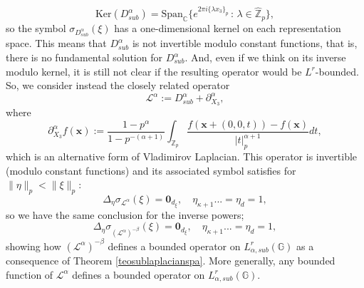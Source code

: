 \documentclass[12pt, reqno]{amsart}
\newcommand{\C}{\mathbb{C}}
\newcommand{\Z}{\mathbb{Z}}
\newcommand{\1}{\mathds{1}}
\newcommand{\G}{\mathbb{G}}
\begin{document}
$$\mathrm{Ker}(D^\alpha_{sub}) = \mathrm{Span}_\C \{ e^{2 \pi i \{\lambda x_3 \}_p} \, : \, \lambda  \in \widehat{\Z}_p \},$$so the symbol $\sigma_{D^\alpha_{sub}} (\xi)$ has a one-dimensional kernel on each representation space. This means that $D^\alpha_{sub}$ is not invertible modulo constant functions, that is, there is no fundamental solution for $D^\alpha_{sub}$. And, even if we think on its inverse modulo kernel, it is still not clear if the resulting operator would be $L^r$-bounded. So, we consider instead the closely related operator $$\mathscr{L}^\alpha := D^\alpha_{sub} + \partial^\alpha_{X_3},$$where $$\partial^\alpha_{X_3}f(\mathbf{x}):= \frac{1-p^\alpha}{1-p^{-(\alpha + 1)}}\int_{\Z_p} \frac{f(\mathbf{x} + (0,0,t)) - f(\mathbf{x})}{|t|_p^{\alpha + 1}} dt,$$which is an alternative form of Vladimirov Laplacian. This operator is invertible (modulo constant functions) and its associated symbol satisfies for $\| \eta \|_p < \| \xi \|_p$: $$\Delta_\eta \sigma_{\mathscr{L}^\alpha} (\xi) = \mathbf{0}_{d_\xi}, \quad \eta_{\kappa+1}...=\eta_d =1,$$so we have the same conclusion for the inverse powers;   $$\Delta_\eta \sigma_{(\mathscr{L}^\alpha)^{- \beta}} (\xi) = \mathbf{0}_{d_\xi}, \quad \eta_{\kappa+1}...=\eta_d =1,$$showing how $(\mathscr{L}^\alpha)^{-\beta}$ defines a bounded operator on $L^r_{\alpha, sub} (\G)$ as a consequence of Theorem \ref{teosublaplacianspa}. More generally, any bounded function of $\mathscr{L}^\alpha$ defines a bounded operator on $L^r_{\alpha, sub}(\G)$.

\nocite{*}


\Addresses
\end{document}
